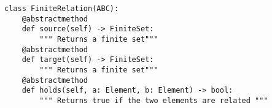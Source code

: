 \begin{verbatim}
class FiniteRelation(ABC):
    @abstractmethod
    def source(self) -> FiniteSet:
        """ Returns a finite set"""
    @abstractmethod
    def target(self) -> FiniteSet:
        """ Returns a finite set"""
    @abstractmethod
    def holds(self, a: Element, b: Element) -> bool:
        """ Returns true if the two elements are related """
\end{verbatim}